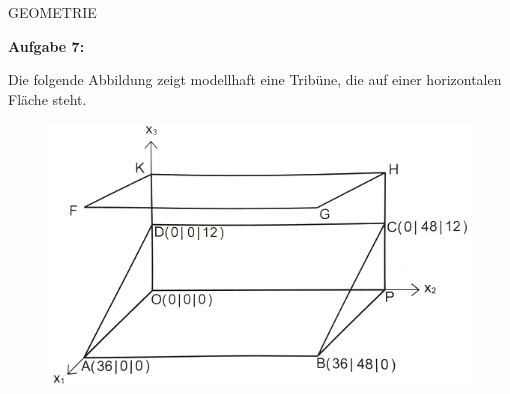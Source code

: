 \documentclass[a4paper,12pt]{article}
\newcommand{\Aufgabe}[1]{
  {
  \vspace*{0.5cm}
  \textsf{\textbf{Aufgabe #1}}
  \vspace*{0.2cm}
  
  }
}
\begin{document}
GEOMETRIE

\Aufgabe{7:} 
Die folgende Abbildung zeigt modellhaft eine Tribüne, die auf einer horizontalen Fläche steht.

\begin{figure}[h!]
  \begin{center}
    \includegraphics[width=0.5\linewidth]{tribüne.jpg}
  \end{center}
\end{figure}


\enlargethispage{2cm}
\end{document}
